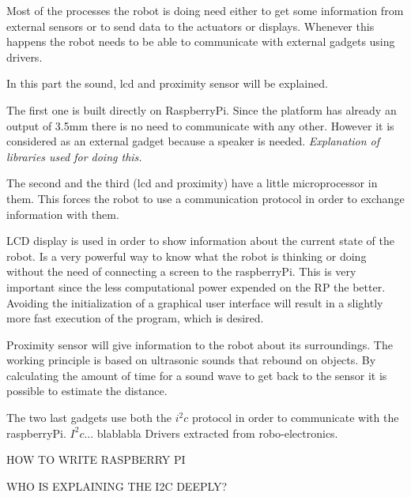Most of the processes the robot is doing need either to get some information from external sensors or to send data to the actuators or displays. Whenever this happens the robot needs to be able to communicate with external gadgets using drivers.

In this part the sound, lcd and proximity sensor will be explained.

The first one is built directly on RaspberryPi. Since the platform has already an output of 3.5mm there is no need to communicate with any other. However it is considered as an external gadget because a speaker is needed. \textit{Explanation of libraries used for doing this.}

The second and the third (lcd and proximity) have a little microprocessor in them. This forces the robot to use a communication protocol in order to exchange information with them.

LCD display is used in order to show information about the current state of the robot. Is a very powerful way to know what the robot is thinking or doing without the need of connecting a screen to the raspberryPi. This is very important since the less computational power expended on the RP the better. Avoiding the initialization of a graphical user interface will result in a slightly more fast execution of the program, which is desired.

Proximity sensor will give information to the robot about its surroundings. The working principle is based on ultrasonic sounds that rebound on objects. By calculating the amount of time for a sound wave to get back to the sensor it is possible to estimate the distance.

The two last gadgets use both the $i^{2}c$ protocol in order to communicate with the raspberryPi. $I^{2}c$... blablabla Drivers extracted from robo-electronics.

HOW TO WRITE RASPBERRY PI

WHO IS EXPLAINING THE I2C DEEPLY?
